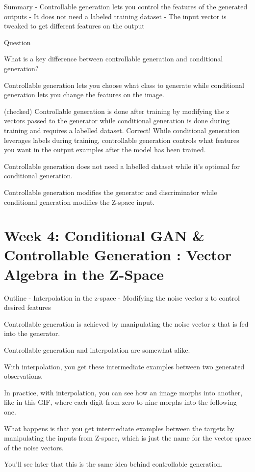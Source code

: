 \documentclass[11pt, onecolumn]{article}
\begin{document}
Summary
- Controllable generation lets you control the features of the generated outputs
- It does not need a labeled training dataset
- The input vector is tweaked to get different features on the output

Question

What is a key difference between controllable generation and conditional generation?

Controllable generation lets you choose what class to generate while conditional generation lets you change the features on the image.

(checked) Controllable generation is done after training by modifying the z vectors passed to the generator while conditional generation is done during training and requires a labelled dataset.
Correct! While conditional generation leverages labels during training, controllable generation controls what features you want in the output examples after the model has been trained.

Controllable generation does not need a labelled dataset while it’s optional for conditional generation.

Controllable generation modifies the generator and discriminator while conditional generation modifies the Z-space input.

\section{Week 4: Conditional GAN \& Controllable Generation : Vector Algebra in the Z-Space}

Outline
- Interpolation in the z-space
- Modifying the noise vector z to control desired features

Controllable generation is achieved by manipulating the noise vector z that is fed into the generator.

Controllable generation and interpolation are somewhat alike.

With interpolation, you get these intermediate examples between two generated observations.

In practice, with interpolation, you can see how an image morphs into another, like in this GIF, where each digit from zero to nine morphs into the following one.

What happens is that you get intermediate examples between the targets by manipulating the inputs from Z-space, which is just the name for the vector space of the noise vectors.

You'll see later that this is the same idea behind controllable generation.
\end{document}
